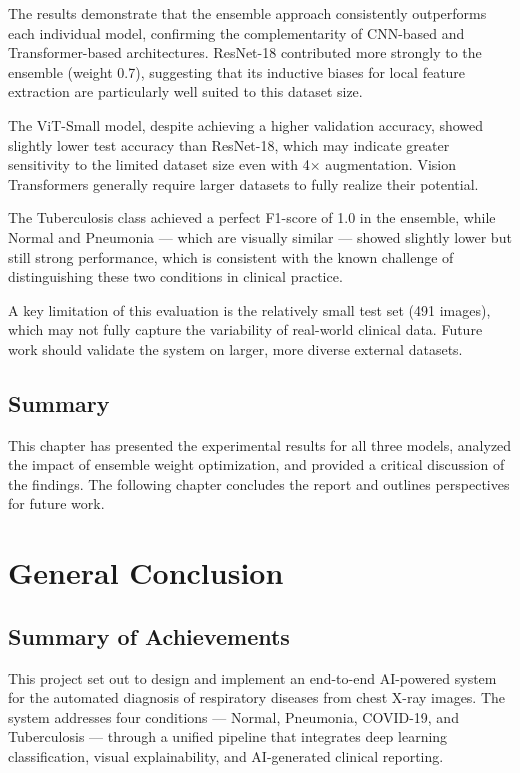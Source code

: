 \documentclass[12pt]{report}
\begin{document}
The results demonstrate that the ensemble approach consistently
outperforms each individual model, confirming the complementarity of
CNN-based and Transformer-based architectures. ResNet-18 contributed
more strongly to the ensemble (weight 0.7), suggesting that its
inductive biases for local feature extraction are particularly well
suited to this dataset size.

The ViT-Small model, despite achieving a higher validation accuracy,
showed slightly lower test accuracy than ResNet-18, which may indicate
greater sensitivity to the limited dataset size even with 4× augmentation.
Vision Transformers generally require larger datasets to fully realize
their potential.

The Tuberculosis class achieved a perfect F1-score of 1.0 in the
ensemble, while Normal and Pneumonia --- which are visually similar ---
showed slightly lower but still strong performance, which is consistent
with the known challenge of distinguishing these two conditions in
clinical practice.

A key limitation of this evaluation is the relatively small test set
(491 images), which may not fully capture the variability of real-world
clinical data. Future work should validate the system on larger,
more diverse external datasets.

\section{Summary}
This chapter has presented the experimental results for all three
models, analyzed the impact of ensemble weight optimization, and
provided a critical discussion of the findings. The following chapter
concludes the report and outlines perspectives for future work.

\chapter*{General Conclusion}

\section*{Summary of Achievements}

This project set out to design and implement an end-to-end AI-powered
system for the automated diagnosis of respiratory diseases from chest
X-ray images. The system addresses four conditions --- Normal, Pneumonia,
COVID-19, and Tuberculosis --- through a unified pipeline that integrates
deep learning classification, visual explainability, and AI-generated
clinical reporting.
\end{document}
